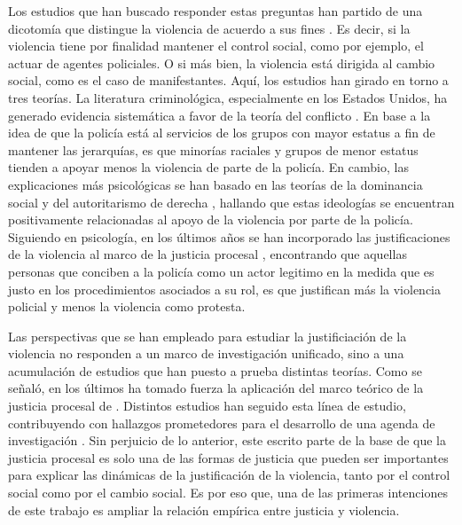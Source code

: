 \documentclass[12pt,twoside]{templates/facsothesis}
\begin{document}
Los estudios que han buscado responder estas preguntas han partido de una dicotomía que distingue la violencia de acuerdo a sus fines \citep{Blumenthal1972}. Es decir, si la violencia tiene por finalidad mantener el control social, como por ejemplo, el actuar de agentes policiales. O si más bien, la violencia está dirigida al cambio social, como es el caso de manifestantes. Aquí, los estudios han girado en torno a tres teorías. La literatura criminológica, especialmente en los Estados Unidos, ha generado evidencia sistemática a favor de la teoría del conflicto \citep{Thompson2004}. En base a la idea de que la policía está al servicios de los grupos con mayor estatus a fin de mantener las jerarquías, es que minorías raciales y grupos de menor estatus tienden a apoyar menos la violencia de parte de la policía. En cambio, las explicaciones más psicológicas se han basado en las teorías de la dominancia social \citep{Sidanius1999} y del autoritarismo de derecha \citep{Altemeyer1988}, hallando que estas ideologías se encuentran positivamente relacionadas al apoyo de la violencia por parte de la policía. Siguiendo en psicología, en los últimos años se han incorporado las justificaciones de la violencia al marco de la justicia procesal \citep{Tyler2006}, encontrando que aquellas personas que conciben a la policía como un actor legitimo en la medida que es justo en los procedimientos asociados a su rol, es que justifican más la violencia policial y menos la violencia como protesta.

Las perspectivas que se han empleado para estudiar la justificiación de la violencia no responden a un marco de investigación unificado, sino a una acumulación de estudios que han puesto a prueba distintas teorías. Como se señaló, en los últimos ha tomado fuerza la aplicación del marco teórico de la justicia procesal de \citet{Tyler2006}. Distintos estudios han seguido esta línea de estudio, contribuyendo con hallazgos prometedores para el desarrollo de una agenda de investigación \citep{Puga2016, Gerber2016, Gerber2017a, Gerber2017}. Sin perjuicio de lo anterior, este escrito parte de la base de que la justicia procesal es solo una de las formas de justicia que pueden ser importantes para explicar las dinámicas de la justificación de la violencia, tanto por el control social como por el cambio social. Es por eso que, una de las primeras intenciones de este trabajo es ampliar la relación empírica entre justicia y violencia.
\end{document}
